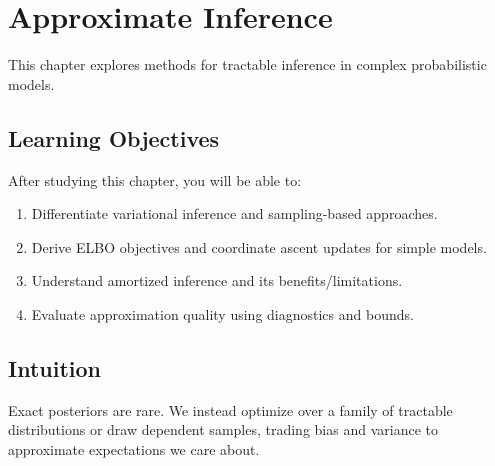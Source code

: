 
\chapter{Approximate Inference}
\label{chap:approximate-inference}

This chapter explores methods for tractable inference in complex probabilistic models.


\section*{Learning Objectives}

After studying this chapter, you will be able to:

\begin{enumerate}
    \item Differentiate variational inference and sampling-based approaches.
    \item Derive ELBO objectives and coordinate ascent updates for simple models.
    \item Understand amortized inference and its benefits/limitations.
    \item Evaluate approximation quality using diagnostics and bounds.
\end{enumerate}



\section*{Intuition}

Exact posteriors are rare. We instead optimize over a family of tractable distributions or draw dependent samples, trading bias and variance to approximate expectations we care about.











